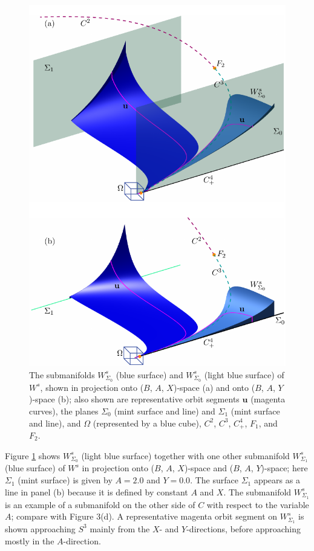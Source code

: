 \documentclass{ws-ijbc}
\begin{document}
\begin{figure}[H]
\centering
\includegraphics[]{./figures/MKMO_5.pdf}
\caption{The submanifolds $W^{s}_{\Sigma_0}$ (blue surface) and $W^{s}_{\Sigma_0}$ (light blue surface) of $W^s$, shown in projection onto ($B$, $A$, $X$)-space (a) and onto ($B$, $A$, $Y$)-space (b); also shown are representative orbit segments $\mathbf{u}$ (magenta curves), the planes $\Sigma_0$ (mint surface and line) and $\Sigma_1$ (mint surface and line), and $\Omega$ (represented by a blue cube), $C^2$, $C^3$, $C^4_+$, $F_1$, and $F_2$.}
\label{figure_5}
\end{figure}

Figure \ref{figure_5} shows $W^s_{\Sigma_0}$ (light blue surface) together with one other submanifold $W^{s}_{\Sigma_1}$ (blue surface) of $W^{s}$ in projection onto ($B$, $A$, $X$)-space and ($B$, $A$, $Y$)-space; here $\Sigma_1$ (mint surface) is given by $A=2.0$ and $Y=0.0$.  The surface $\Sigma_1$ appears as a line in panel (b) because it is defined by constant $A$ and $X$.  The submanifold $W^s_{\Sigma_1}$ is an example of a submanifold on the other side of $C$ with respect to the variable $A$; compare with Figure 3(d).  A representative magenta orbit segment on $W^s_{\Sigma_1}$ is shown approaching $S^3$ mainly from the $X$- and $Y$-directions, before approaching mostly in the $A$-direction.
\end{document}
